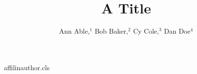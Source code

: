 \begin{filecontents*}[overwrite]{affilinauthor.cls}
\def\affilfont{\small}
\def\affil#1{\par{\reset@font\affilfont#1\par}}
\def\address#1{\par{\reset@font\affilfont#1\par}}
\def\@maketitle{\newpage{\Large\bfseries\@title\par}\vskip1em\noindent{\bfseries\@author\par}\vskip1em}
\end{filecontents*}
\documentclass{affilinauthor}

\title{A Title}
\author{Ann Able,$^1$ Bob Baker,$^2$ Cy Cole,$^3$ Dan Doe$^4$}
\address{\itshape $^1$Univ A, Town\\ $^2$Univ B, City}
\address{{\bfseries $^3$Lab C, Place\\ $^4$Lab D, Place}}
\maketitle
Body.

